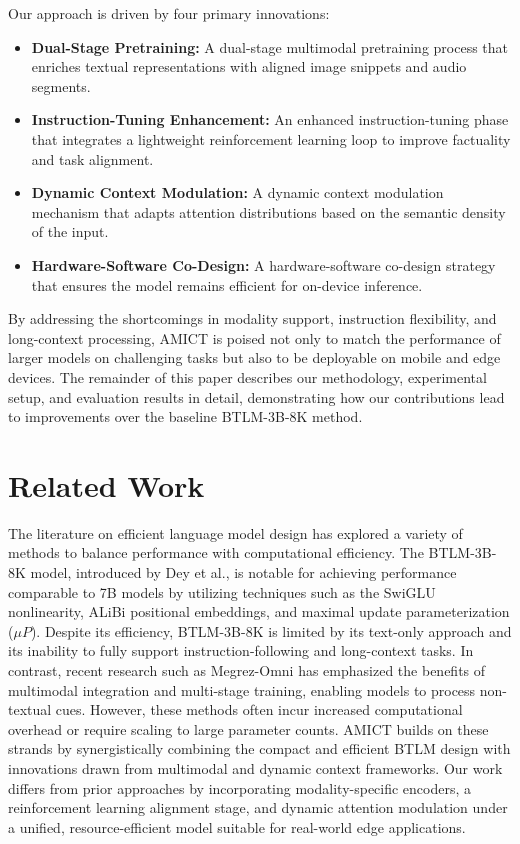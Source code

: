 \documentclass{article} %
\begin{document}
Our approach is driven by four primary innovations:
\begin{itemize}
  \item \textbf{Dual-Stage Pretraining:} A dual-stage multimodal pretraining process that enriches textual representations with aligned image snippets and audio segments.
  \item \textbf{Instruction-Tuning Enhancement:} An enhanced instruction-tuning phase that integrates a lightweight reinforcement learning loop to improve factuality and task alignment.
  \item \textbf{Dynamic Context Modulation:} A dynamic context modulation mechanism that adapts attention distributions based on the semantic density of the input.
  \item \textbf{Hardware-Software Co-Design:} A hardware-software co-design strategy that ensures the model remains efficient for on-device inference.
\end{itemize}

By addressing the shortcomings in modality support, instruction flexibility, and long-context processing, AMICT is poised not only to match the performance of larger models on challenging tasks but also to be deployable on mobile and edge devices. The remainder of this paper describes our methodology, experimental setup, and evaluation results in detail, demonstrating how our contributions lead to improvements over the baseline BTLM-3B-8K method.

\section{Related Work}
\label{sec:related}
The literature on efficient language model design has explored a variety of methods to balance performance with computational efficiency. The BTLM-3B-8K model, introduced by Dey et al., is notable for achieving performance comparable to 7B models by utilizing techniques such as the SwiGLU nonlinearity, ALiBi positional embeddings, and maximal update parameterization (\(\mu P\)). Despite its efficiency, BTLM-3B-8K is limited by its text-only approach and its inability to fully support instruction-following and long-context tasks. In contrast, recent research such as Megrez-Omni has emphasized the benefits of multimodal integration and multi-stage training, enabling models to process non-textual cues. However, these methods often incur increased computational overhead or require scaling to large parameter counts. AMICT builds on these strands by synergistically combining the compact and efficient BTLM design with innovations drawn from multimodal and dynamic context frameworks. Our work differs from prior approaches by incorporating modality-specific encoders, a reinforcement learning alignment stage, and dynamic attention modulation under a unified, resource-efficient model suitable for real-world edge applications.
\end{document}

